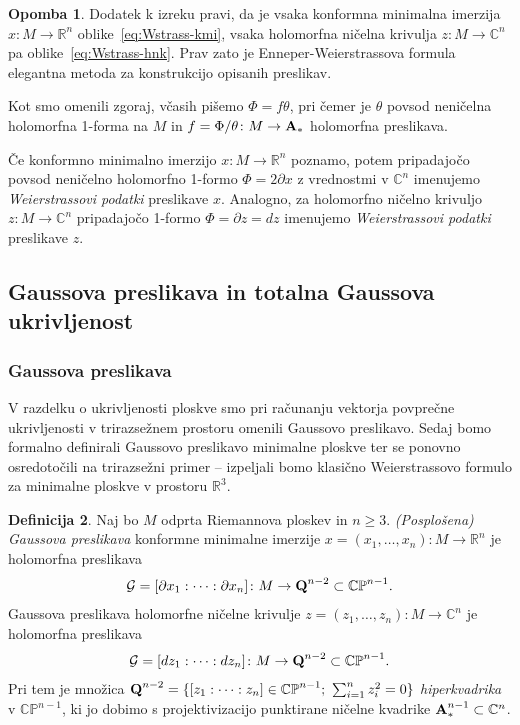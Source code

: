 \documentclass[12pt,a4paper,twoside]{article}
\theoremstyle{definition} %
\newtheorem{definicija}{Definicija}[section]
\newtheorem{opomba}[definicija]{Opomba}
\theoremstyle{plain} %
\numberwithin{equation}{section}  %
\newcommand{\R}{\mathbb R}
\newcommand{\C}{\mathbb C}
\begin{document}
\begin{opomba}
Dodatek k izreku pravi, da je vsaka konformna minimalna imerzija $x \colon M \to \R^{n}$ oblike~\eqref{eq:Wstrass-kmi}, vsaka holomorfna ničelna krivulja $z \colon M \to \C^{n}$ pa oblike~\eqref{eq:Wstrass-hnk}. Prav zato je Enneper-Weierstrassova formula elegantna metoda za konstrukcijo opisanih preslikav.

Kot smo omenili zgoraj, včasih pišemo $\Phi = f \theta$, pri čemer je $\theta$ povsod neničelna holomorfna 1-forma na $M$ in $f = \Phi / \theta \colon M \to \textbf{\textup{A}}_{*}$ holomorfna preslikava.
\end{opomba}

Če konformno minimalno imerzijo $x \colon M \to \R^{n}$ poznamo, potem pripadajočo povsod neničelno holomorfno 1-formo $\Phi = 2 \partial{x}$ z vrednostmi v $\C^{n}$ imenujemo \emph{Weierstrassovi podatki} preslikave $x$. 
Analogno, za holomorfno ničelno krivuljo $z \colon M \to \C^{n}$ pripadajočo 1-formo $\Phi = \partial{z} = dz$ imenujemo \emph{Weierstrassovi podatki} preslikave $z$.

\subsection{Gaussova preslikava in totalna Gaussova ukrivljenost}
%
\subsubsection{Gaussova preslikava}
V razdelku o ukrivljenosti ploskve smo pri računanju vektorja povprečne ukrivljenosti v trirazsežnem prostoru omenili Gaussovo preslikavo. Sedaj bomo formalno definirali Gaussovo preslikavo minimalne ploskve ter se ponovno osredotočili na trirazsežni primer -- izpeljali bomo klasično Weierstrassovo formulo za minimalne ploskve v prostoru $\mathbb{R}^3$.

\begin{definicija}
Naj bo $M$ odprta Riemannova ploskev in $n \geq 3$. \emph{(Posplošena) Gaussova preslikava} konformne minimalne imerzije $x = (x_{1}, \dots , x_{n}) \colon M \to \mathbb{R}^{n}$ je holomorfna preslikava
\begin{gather}
\mathcal{G} = [\partial x_{1} : \cdots : \partial x_{n}] \colon M \to \textup{\textbf{Q}}^{n-2} \subset \mathbb{CP}^{n-1}.
\end{gather}
Gaussova preslikava holomorfne ničelne krivulje $z = (z_{1}, \dots , z_{n}) \colon M \to \mathbb{C}^{n}$ je holomorfna preslikava
\begin{gather*}
\mathcal{G} = [dz_{1} : \cdots : dz_{n}] \colon M \to \textup{\textbf{Q}}^{n-2} \subset \mathbb{CP}^{n-1}.
\end{gather*}
Pri tem je množica $\textup{\textbf{Q}}^{n-2} = \{ [z_{1} : \cdots : z_{n}] \in \mathbb{CP}^{n-1} ; \ \sum_{i=1}^{n}z_{i}^2 = 0 \}$ \emph{hiperkvadrika} v $\mathbb{CP}^{n-1}$, ki jo dobimo s projektivizacijo punktirane ničelne kvadrike $\textup{\textbf{A}}_{*}^{n-1} \subset \mathbb{C}^{n}$.
\end{definicija}
\end{document}
